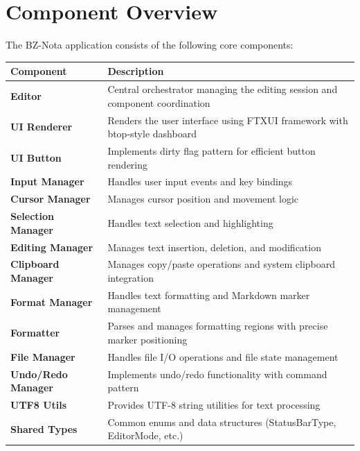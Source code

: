 \documentclass[12pt,a4paper,oneside,openany]{report}
\begin{document}
\section{Component Overview}

The BZ-Nota application consists of the following core components:

\begin{table}[H]
	\centering
	\begin{tabular}{|p{5cm}|p{8cm}|}
		\hline
		\textbf{Component}         & \textbf{Description}                                                         \\
		\hline
		\textbf{Editor}            & Central orchestrator managing the editing session and component coordination \\
		\hline
		\textbf{UI Renderer}       & Renders the user interface using FTXUI framework with btop-style dashboard   \\
		\hline
		\textbf{UI Button}         & Implements dirty flag pattern for efficient button rendering                 \\
		\hline
		\textbf{Input Manager}     & Handles user input events and key bindings                                   \\
		\hline
		\textbf{Cursor Manager}    & Manages cursor position and movement logic                                   \\
		\hline
		\textbf{Selection Manager} & Handles text selection and highlighting                                      \\
		\hline
		\textbf{Editing Manager}   & Manages text insertion, deletion, and modification                           \\
		\hline
		\textbf{Clipboard Manager} & Manages copy/paste operations and system clipboard integration               \\
		\hline
		\textbf{Format Manager}    & Handles text formatting and Markdown marker management                       \\
		\hline
		\textbf{Formatter}         & Parses and manages formatting regions with precise marker positioning        \\
		\hline
		\textbf{File Manager}      & Handles file I/O operations and file state management                        \\
		\hline
		\textbf{Undo/Redo Manager} & Implements undo/redo functionality with command pattern                      \\
		\hline
		\textbf{UTF8 Utils}        & Provides UTF-8 string utilities for text processing                          \\
		\hline
		\textbf{Shared Types}      & Common enums and data structures (StatusBarType, EditorMode, etc.)           \\
		\hline
	\end{tabular}
\end{table}
\end{document}
